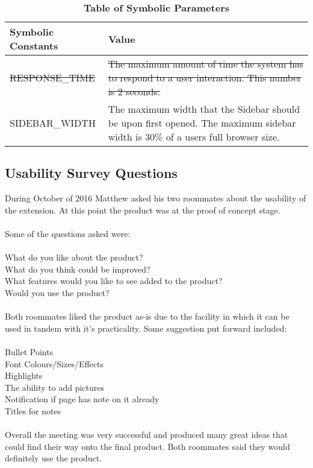 \documentclass[12pt, titlepage]{article}
\begin{document}
\begin{table}[!htbp]
	\caption{\textbf{Table of Symbolic Parameters}} \label{Table}
	
	\begin{tabularx}{\textwidth}{p{5cm}X}
		\toprule
		\textbf{Symbolic Constants} & \textbf{Value}\\
		\midrule
		\sout{RESPONSE\_TIME} & \sout{The maximum amount of time the system has 
		to respond to a user interaction. This number is 2 seconds.}  \\
		SIDEBAR\_WIDTH & The maximum width that the Sidebar should be upon 
		first opened. The maximum sidebar width is 30\% of a users full browser 
		size.\\
		\bottomrule
	\end{tabularx}
	
\end{table}	

\subsection{Usability Survey Questions}

During October of 2016 Matthew asked his two roommates about the usability of 
the extension. At this point the product was at the proof of concept stage. \\
\\
Some of the questions asked were:\\
\\
What do you like about the product?\\
What do you think could be improved?\\
What features would you like to see added to the product?\\
Would you use the product?\\
\\
Both roommates liked the product as-is due to the facility in which it can be 
used in tandem with it's practicality. Some suggestion put forward included:\\
\\
Bullet Points\\
Font Colours/Sizes/Effects\\
Highlights\\
The ability to add pictures\\
Notification if page has note on it already\\
Titles for notes\\
\\
Overall the meeting was very successful and produced many great ideas that 
could find their way onto the final product. Both roommates said they would 
definitely use the product. 



%
\end{document}
